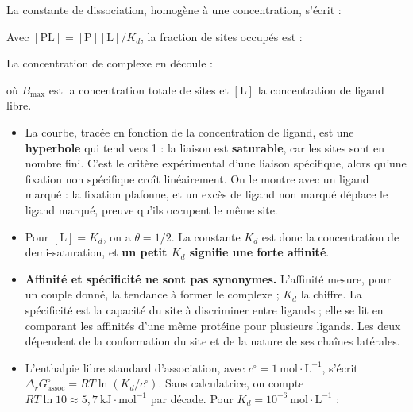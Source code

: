 \documentclass[11pt,a4paper]{article}
\providecommand{\tightlist}{\setlength{\itemsep}{0pt}\setlength{\parskip}{0pt}}
\newcommand{\equationajustee}[1]{%
  \sbox{\boiteequation}{$\displaystyle #1$}%
  \ifdim\wd\boiteequation>\linewidth
    \[\resizebox{\linewidth}{!}{\usebox{\boiteequation}}\]%
  \else
    \[#1\]%
  \fi}
\begin{document}
\equationajustee{\mathrm{P} + \mathrm{L} \;\underset{k_{-1}}{\overset{k_{1}}{\rightleftharpoons}}\; \mathrm{PL}}

La constante de dissociation, homogène à une concentration, s'écrit :

\equationajustee{\begin{aligned}
K_d &= \frac{[\mathrm{P}][\mathrm{L}]}{[\mathrm{PL}]} \\
&= \frac{k_{-1}}{k_{1}}
\end{aligned}}

Avec \([\mathrm{PL}] = [\mathrm{P}][\mathrm{L}]/K_d\), la fraction de sites occupés est :

\equationajustee{\begin{aligned}
\theta &= \frac{[\mathrm{PL}]}{[\mathrm{P}]+[\mathrm{PL}]} \\
&= \frac{[\mathrm{P}][\mathrm{L}]/K_d}{[\mathrm{P}] + [\mathrm{P}][\mathrm{L}]/K_d} \\
&= \frac{[\mathrm{L}]}{K_d+[\mathrm{L}]}
\end{aligned}}

\equationajustee{\boxed{\theta = \frac{[\mathrm{L}]}{K_d+[\mathrm{L}]}}}

La concentration de complexe en découle :

\equationajustee{[\mathrm{PL}] = B_{\max}\,\frac{[\mathrm{L}]}{K_d+[\mathrm{L}]}}

où \(B_{\max}\) est la concentration totale de sites et \([\mathrm{L}]\) la concentration de ligand libre.

\begin{itemize}
\tightlist
\item
  La courbe, tracée en fonction de la concentration de ligand, est une \textbf{hyperbole} qui tend vers 1 : la liaison est \textbf{saturable}, car les sites sont en nombre fini. C'est le critère expérimental d'une liaison spécifique, alors qu'une fixation non spécifique croît linéairement. On le montre avec un ligand marqué : la fixation plafonne, et un excès de ligand non marqué déplace le ligand marqué, preuve qu'ils occupent le même site.
\item
  Pour \([\mathrm{L}] = K_d\), on a \(\theta = 1/2\). La constante \(K_d\) est donc la concentration de demi-saturation, et \textbf{un petit \(K_d\) signifie une forte affinité}.
\item
  \textbf{Affinité et spécificité ne sont pas synonymes.} L'affinité mesure, pour un couple donné, la tendance à former le complexe ; \(K_d\) la chiffre. La spécificité est la capacité du site à discriminer entre ligands ; elle se lit en comparant les affinités d'une même protéine pour plusieurs ligands. Les deux dépendent de la conformation du site et de la nature de ses chaînes latérales.
\item
  L'enthalpie libre standard d'association, avec \(c^\circ = 1\ \mathrm{mol\cdot L^{-1}}\), s'écrit \(\Delta_r G^\circ_{\text{assoc}} = RT\ln(K_d/c^\circ)\). Sans calculatrice, on compte \(RT\ln 10 \approx 5{,}7\ \mathrm{kJ\cdot mol^{-1}}\) par décade. Pour \(K_d = 10^{-6}\ \mathrm{mol\cdot L^{-1}}\) :
\end{itemize}
\end{document}
